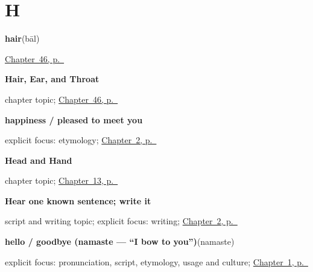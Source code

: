 \section*{H}

\noindent\begin{minipage}[t]{\linewidth}
\raggedright
\textbf{hair}\enspace\emph{}\enspace(bāl)\par
\footnotesize \hyperref[ch:hi-body-more]{Chapter~46, p.~\pageref*{ch:hi-body-more}}
\end{minipage}\par\smallskip

\noindent\begin{minipage}[t]{\linewidth}
\raggedright
\textbf{Hair, Ear, and Throat}\par
\footnotesize chapter topic; \hyperref[ch:hi-body-more]{Chapter~46, p.~\pageref*{ch:hi-body-more}}
\end{minipage}\par\smallskip

\noindent\begin{minipage}[t]{\linewidth}
\raggedright
\textbf{happiness / pleased to meet you}\enspace\emph{}\par
\footnotesize explicit focus: etymology; \hyperref[ch:introductions]{Chapter~2, p.~\pageref*{ch:introductions}}
\end{minipage}\par\smallskip

\noindent\begin{minipage}[t]{\linewidth}
\raggedright
\textbf{Head and Hand}\par
\footnotesize chapter topic; \hyperref[ch:hi-head-and-hand]{Chapter~13, p.~\pageref*{ch:hi-head-and-hand}}
\end{minipage}\par\smallskip

\noindent\begin{minipage}[t]{\linewidth}
\raggedright
\textbf{Hear one known sentence; write it}\par
\footnotesize script and writing topic; explicit focus: writing; \hyperref[ch:introductions]{Chapter~2, p.~\pageref*{ch:introductions}}
\end{minipage}\par\smallskip

\noindent\begin{minipage}[t]{\linewidth}
\raggedright
\textbf{hello / goodbye (namaste — \textquotedblleft{}I bow to you\textquotedblright{})}\enspace\emph{}\enspace(namaste)\par
\footnotesize explicit focus: pronunciation, script, etymology, usage and culture; \hyperref[ch:greetings]{Chapter~1, p.~\pageref*{ch:greetings}}
\end{minipage}\par\smallskip

